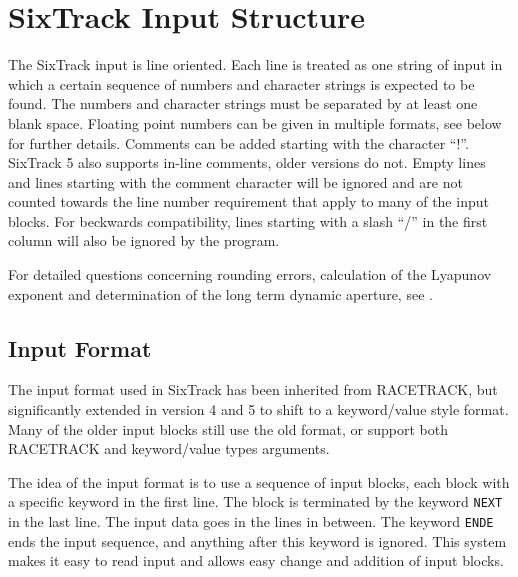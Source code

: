 \section{SixTrack Input Structure}

The SixTrack input is line oriented.
Each line is treated as one string of input in which a certain sequence of numbers and character strings is expected to be found.
The numbers and character strings must be separated by at least one blank space.
Floating point numbers can be given in multiple formats, see below for further details.
Comments can be added starting with the character ``!''.
SixTrack 5 also supports in-line comments, older versions do not.
Empty lines and lines starting with the comment character will be ignored and are not counted towards the line number requirement that apply to many of the input blocks.
For beckwards compatibility, lines starting with a slash ``/'' in the first column will also be ignored by the program.

For detailed questions concerning rounding errors, calculation of the Lyapunov exponent and determination of the long term dynamic aperture, see \cite{thesis}.

\subsection{Input Format} \label{sec:informat}

The input format used in SixTrack has been inherited from RACETRACK, but significantly extended in version 4 and 5 to shift to a keyword/value style format.
Many of the older input blocks still use the old format, or support both RACETRACK and keyword/value types arguments.

The idea of the input format is to use a sequence of input blocks, each block with a specific keyword in the first line.
The block is terminated by the keyword \texttt{NEXT} in the last line.
The input data goes in the lines in between.
The keyword \texttt{ENDE} ends the input sequence, and anything after this keyword is ignored.
This system makes it easy to read input and allows easy change and addition of input blocks.

